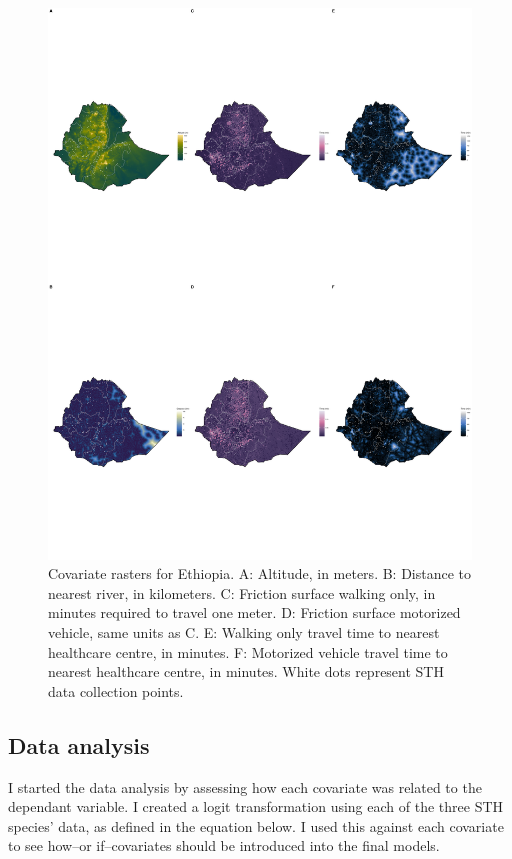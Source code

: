 \documentclass[
]{article}
\begin{document}
\begin{figure}
\centering
\includegraphics{write_up_files/figure-latex/covariates_figure-1.pdf}
\caption{Covariate rasters for Ethiopia. A: Altitude, in meters. B:
Distance to nearest river, in kilometers. C: Friction surface walking
only, in minutes required to travel one meter. D: Friction surface
motorized vehicle, same units as C. E: Walking only travel time to
nearest healthcare centre, in minutes. F: Motorized vehicle travel time
to nearest healthcare centre, in minutes. White dots represent STH data
collection points.}
\end{figure}

\hypertarget{data-analysis}{%
\subsection{Data analysis}\label{data-analysis}}

I started the data analysis by assessing how each covariate was related
to the dependant variable. I created a logit transformation using each
of the three STH species' data, as defined in the equation below. I used
this against each covariate to see how--or if--covariates should be
introduced into the final models.
\end{document}
